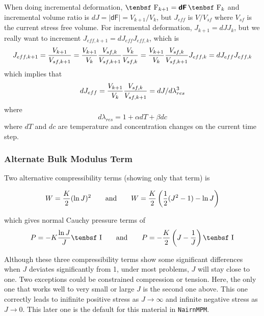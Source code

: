 \documentclass[11pt]{article}
\newcommand{\tens}[1]{\boldsymbol{\mathsf{#1}}}
\def\F{\hbox{\tenbsf F}}
\def\I{\hbox{\tenbsf I}}
\begin{document}
When doing incremental deformation, $\F_{k+1} = \tens{dF}\thinspace\F_k$ and incremental volume ratio is $dJ = |\tens{dF}| = V_{k+1}/ V_k$, but $J_{eff}$ is $V/V_{sf}$ where $V_{sf}$ is the current stress free volume. For incremental deformation, $J_{k+1} = dJ J_k$, but we really want to increment $J_{eff,k+1} = dJ_{eff}J_{eff,k}$, which is\begin{equation}
     J_{eff,k+1} = {V_{k+1}\over V_{sf,k+1}} = {V_{k+1}\over V_{k}}{V_{sf,k}\over V_{sf,k+1}} {V_{k}\over V_{sf,k}}
             = {V_{k+1}\over V_{k}}{V_{sf,k}\over V_{sf,k+1}} J_{eff,k} = dJ_{eff}J_{eff,k}
\end{equation}
which implies that
\begin{equation}
      dJ_{eff} = {V_{k+1}\over V_{k}}{V_{sf,k}\over V_{sf,k+1}} = dJ/d\lambda_{res}^3
\end{equation}
where
\begin{equation}
    d\lambda_{res} = 1 + \alpha dT + \beta dc
\end{equation}
where $dT$ and $dc$ are temperature and concentration changes on the current time step.




\subsubsection{Alternate Bulk Modulus Term}

Two alternative compressibility terms (showing only that term) is

\begin{equation}
W = {K\over2}(\ln J)^2  \qquad{\rm and}\qquad W = {K\over2}\left({1\over2}(J^2-1) - \ln J\right)
\end{equation}

\noindent which gives normal Cauchy pressure terms of
\begin{equation}
     P = -K {\ln J\over J}\I  \qquad{\rm and}\qquad P = - {K\over 2}\left(J-{1\over J}\right)\I
\end{equation}

\noindent Although these three compressibility terms show some significant differences when $J$ deviates significantly from 1, under most problems, $J$ will stay close to one. Two exceptions could be constrained compression or tension. Here, the only one that works well to very small or large $J$ is the second one above. This one correctly leads to inifinite positive stress as $J\to\infty$ and infinite negative stress as $J\to0$. This later one is the default for this material in {\tt NairnMPM}.
\end{document}
